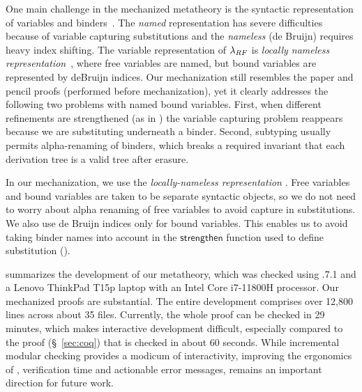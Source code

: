 One main challenge in the mechanized
metatheory is the syntactic representation
of variables and binders~\cite{Aydemir05}.
%
The \emph{named} representation
has severe difficulties because
of variable capturing substitutions
and the \emph{nameless} (\aka de Bruijn)
requires heavy index shifting.
%
The variable representation
of $\lambda_{RF}$ is
\emph{locally nameless representation}~\cite{Pollack93,AydemirCPPW08},
where free variables are named, but
bound variables are represented by
deBruijn indices.
%
Our mechanization still resembles
the paper and pencil proofs (performed
before  mechanization),
yet it clearly addresses
the following two problems with named bound variables.
%
First, when different refinements are strengthened
(as in ) the variable
capturing problem reappears
because we are substituting underneath a binder.
%
Second, subtyping usually permits
alpha-renaming of binders,
which breaks a required invariant
that each \sysrf derivation tree
is a valid \sysf tree after erasure. \\

\begin{fullversion}
%
In our mechanization, we use the
\emph{locally-nameless representation} \cite{AydemirCPPW08,Chargueraud12}.
%
Free variables and bound variables
are taken to be separate syntactic
objects, so we do not need to worry
about alpha renaming of free variables
to avoid capture in substitutions.
%
We also use de Bruijn indices only
for bound variables. This enables us to avoid
taking binder names into account in the
$\mathsf{strengthen}$ function used to define
substitution ().
%
%
\end{fullversion}

 summarizes the development 
of our metatheory,
which was checked using .7.1
and a Lenovo ThinkPad T15p laptop with
an Intel Core i7-11800H processor.
%
Our mechanized proofs are substantial. The entire
\lh development comprises over 12,800 lines 
across about 35 files. 
%
Currently, the whole \lh proof can be checked
in 29 minutes, which makes interactive
development difficult, especially compared to 
the \coq proof (\S~\ref{sec:coq}) that 
is checked in about 60 seconds.
%
While incremental modular checking provides
a modicum of interactivity, improving the
ergonomics of \lh, 
\ie verification time and 
actionable error messages, remains an important
direction for future work.

